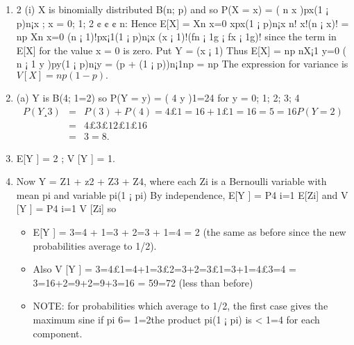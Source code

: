 \documentclass[a4paper,12pt]{article}
\begin{document}
\begin{enumerate}
\item 2 (i) X is binomially distributed B(n; p) and so P(X = x) = ( n
x
)px(1 ¡ p)n¡x ; x =
0; 1; 2 ¢ ¢ ¢ n:
Hence
E[X] =
Xn
x=0
xpx(1 ¡ p)n¡x n!
x!(n ¡ x)!
= np
Xn
x=0
(n ¡ 1)!px¡1(1 ¡ p)n¡x
(x ¡ 1)!(fn ¡ 1g ¡ fx ¡ 1g)!
since the term in E[X] for the value x = 0 is zero. Put Y = (x ¡ 1)
Thus
E[X] = np
nX¡1
y=0
( n ¡ 1
y
)py(1 ¡ p)n¡y = (p + (1 ¡ p))n¡1np = np
The expression for variance is $V [X] = np(1 - p).$
\item  (a) Y is B(4; 1=2) so P(Y = y) = (
4
y
)1=24 for y = 0; 1; 2; 3; 4
\begin{eqnarray*}
P(Y ¸ 3) &=& P(3) + P(4) = 4 £ 1=16 + 1 £ 1=16 = 5=16
P(Y = 2)\\ &=& 4£3£1 
2£1£16 \\ &=& 3=8.
\end{eqnarray*}
\item E[Y ] = 2 ; V [Y ] = 1.
\item Now Y = Z1 + z2 + Z3 + Z4, where each Zi is a Bernoulli variable with mean pi
and variable pi(1 ¡ pi) By independence, E[Y ] =
P4
i=1
E[Zi] and V [Y ] =
P4
i=1
V [Zi] so
\begin{itemize}
    \item E[Y ] = 3=4 + 1=3 + 2=3 + 1=4 = 2 (the same as before since the new probabilities
average to 1/2).
\item Also V [Y ] = 3=4£1=4+1=3£2=3+2=3£1=3+1=4£3=4 = 3=16+2=9+2=9+3=16 =
59=72 (less than before)
\item NOTE: for probabilities which average to 1/2, the first case gives the maximum sine
if pi 6= 1=2the product pi(1 ¡ pi) is < 1=4 for each component.
\end{itemize}

\end{enumerate}
\end{document}
